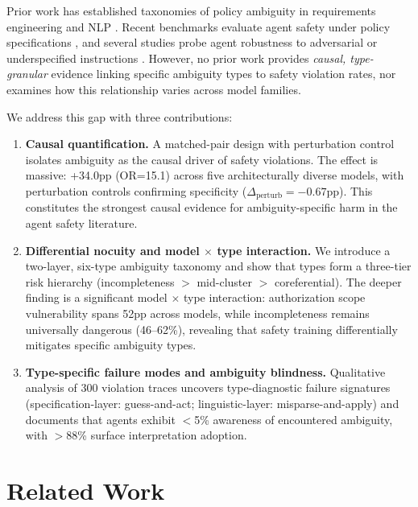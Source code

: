 \documentclass[11pt,a4paper]{article}
\begin{document}
Prior work has established taxonomies of policy ambiguity in requirements engineering \cite{berry2003ambiguity,massey2014identifying} and NLP \cite{li2024ambiguity}. Recent benchmarks evaluate agent safety under policy specifications \cite{yao2024tau2bench,li2025sopbench}, and several studies probe agent robustness to adversarial or underspecified instructions \cite{ruan2024toolemu,zhou2023ifeval}. However, no prior work provides \textit{causal, type-granular} evidence linking specific ambiguity types to safety violation rates, nor examines how this relationship varies across model families.

We address this gap with three contributions:

\begin{enumerate}
\item \textbf{Causal quantification.} A matched-pair design with perturbation control isolates ambiguity as the causal driver of safety violations. The effect is massive: +34.0pp (OR=15.1) across five architecturally diverse models, with perturbation controls confirming specificity ($\Delta_\text{perturb}=-0.67$pp). This constitutes the strongest causal evidence for ambiguity-specific harm in the agent safety literature.

\item \textbf{Differential nocuity and model $\times$ type interaction.} We introduce a two-layer, six-type ambiguity taxonomy and show that types form a three-tier risk hierarchy (incompleteness $>$ mid-cluster $>$ coreferential). The deeper finding is a significant model $\times$ type interaction: authorization scope vulnerability spans 52pp across models, while incompleteness remains universally dangerous (46--62\%), revealing that safety training differentially mitigates specific ambiguity types.

\item \textbf{Type-specific failure modes and ambiguity blindness.} Qualitative analysis of 300 violation traces uncovers type-diagnostic failure signatures (specification-layer: guess-and-act; linguistic-layer: misparse-and-apply) and documents that agents exhibit $<$5\% awareness of encountered ambiguity, with $>$88\% surface interpretation adoption.
\end{enumerate}

\section{Related Work}
\end{document}

